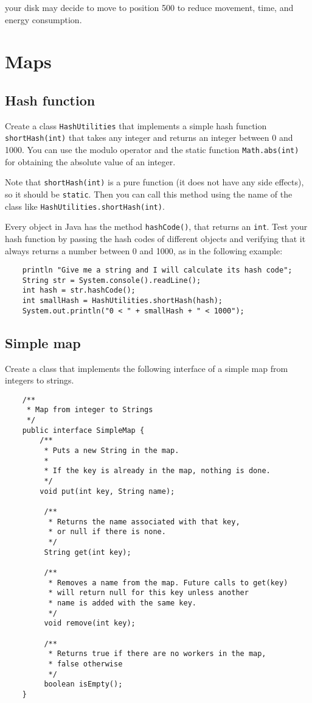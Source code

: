\documentclass{article}
\begin{document}
your disk may decide to move to position
500 to reduce movement, time, and energy consumption.

\section{Maps}
\label{sec:using-maps}

\subsection{Hash function}
\label{sec:hash-function}

Create a class \verb+HashUtilities+ that implements a simple hash
function \verb+shortHash(int)+ that takes any integer and returns an
integer between 0 and 1000. You can use the modulo operator and the
static function \verb+Math.abs(int)+ for obtaining the absolute value
of an integer. 

Note that \verb+shortHash(int)+ is a pure function (it 
does not have any side effects),
so it should be \verb+static+. Then you can call this method using the
name of the class like \verb+HashUtilities.shortHash(int)+. 

Every object in Java has the method \verb+hashCode()+, that returns an
\verb+int+. Test your hash function by passing the hash codes of
different objects and verifying that it always returns a number
between 0 and 1000, as in the following example:

\begin{verbatim}
    println "Give me a string and I will calculate its hash code";
    String str = System.console().readLine(); 
    int hash = str.hashCode();
    int smallHash = HashUtilities.shortHash(hash);
    System.out.println("0 < " + smallHash + " < 1000");
\end{verbatim}

\subsection{Simple map}
\label{sec:simple-map-1}

Create a class that implements the following interface of a simple map
from integers to strings. 

\begin{verbatim}
    /**
     * Map from integer to Strings
     */
    public interface SimpleMap {
        /**
         * Puts a new String in the map. 
         * 
         * If the key is already in the map, nothing is done.
         */
        void put(int key, String name);
    
         /**
          * Returns the name associated with that key, 
          * or null if there is none.
          */
         String get(int key);
    
         /**
          * Removes a name from the map. Future calls to get(key) 
          * will return null for this key unless another 
          * name is added with the same key.
          */
         void remove(int key);
    
         /** 
          * Returns true if there are no workers in the map, 
          * false otherwise
          */
         boolean isEmpty();
    }
\end{verbatim}
\end{document}
